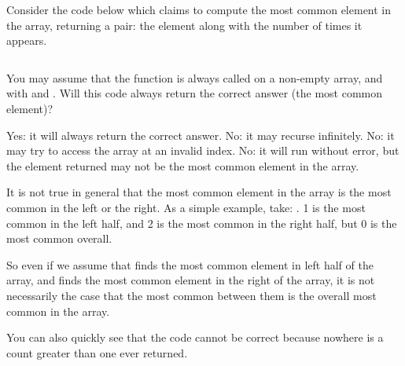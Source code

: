 \begin{prob}
    Consider the code below which claims to compute the most common
    element in the array, returning a pair: the element along with the
    number of times it appears.

    \inputminted[lastline=16]{python}{\thisdir/code.py}

    You may assume that the function is always called on a non-empty array,
    and with  and .
    Will this code always return the correct answer (the most common element)?

    \begin{choices}
        \choice Yes: it will always return the correct answer.
        \choice No: it may recurse infinitely.
        \choice No: it may try to access the array at an invalid index.
        \correctchoice No: it will run without error, but the element returned may
            not be the most common element in the array.
    \end{choices}

    \begin{soln}
        It is not true in general that the most common element in the array is
        the most common in the left or the right. As a simple example, take:
        \python{[1,1,1,0,0,2,2,2,0,0]}.
        1 is the most common in the left half, and 2 is the most common in the right half,
        but 0 is the most common overall.

        So even if we assume that 
        finds the most common element in left half of the array, and
         finds the most common element
        in the right of the array, it is not necessarily the case that the most
        common between them is the overall most common in the array.

        You can also quickly see that the code cannot be correct because nowhere
        is a count greater than one ever returned.
    \end{soln}

\end{prob}
